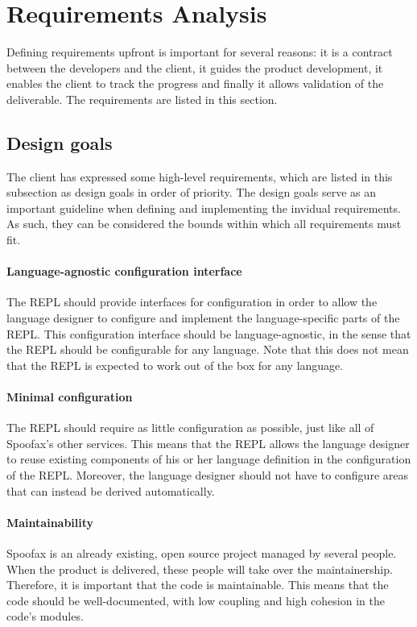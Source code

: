 \section{Requirements Analysis}
\label{sec:requirement-analysis}

Defining requirements upfront is important for several reasons: it is a contract
between the developers and the client, it guides the product development, it
enables the client to track the progress and finally it allows validation of the
deliverable. The requirements are listed in this section.

\subsection{Design goals}
\label{ssec:goals}

The client has expressed some high-level requirements, which are listed in this
subsection as design goals in order of priority. The design goals serve as an
important guideline when defining and implementing the invidual requirements. As
such, they can be considered the bounds within which all requirements must fit.

\paragraph{Language-agnostic configuration interface} The REPL should
provide interfaces for configuration in order to allow the language
designer to configure and implement the language-specific parts of the
REPL. This configuration interface should be language-agnostic, in the
sense that the REPL should be configurable for any language. Note that
this does not mean that the REPL is expected to work out of the box
for any language.

\paragraph{Minimal configuration} The REPL should require as little
configuration as possible, just like all of Spoofax's other
services. This means that the REPL allows the language designer to
reuse existing components of his or her language definition in the
configuration of the REPL. Moreover, the language designer should not
have to configure areas that can instead be derived automatically.

\paragraph{Maintainability} Spoofax is an already existing, open source project
managed by several people. When the product is delivered, these people will take
over the maintainership. Therefore, it is important that the code is
maintainable. This means that the code should be well-documented, with low
coupling and high cohesion in the code's modules.

